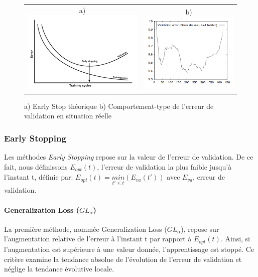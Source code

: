 \begin{figure}
    \begin{tabular}{cc}
       a) \includegraphics[scale=0.9]{./tex/regularisation/valid_ideal.png} &
         b) \includegraphics[scale=0.4]{./tex/regularisation/val_reel.png}\\
    \end{tabular}
    \caption{a) Early Stop théorique b) Comportement-type de l'erreur de validation en situation réelle}
    \label{early_courbe}
\end{figure}

\subsubsection{Early Stopping}
Les méthodes \textit{Early Stopping} repose sur la valeur de l'erreur de validation. De ce fait, nous définissons $E_{opt}(t)$, l'erreur de validation la plus faible jusqu'à l'instant t, définie par: $E_{opt}(t)=\underset{t' \leq t}{min}(E_{va}(t'))$ avec $E_{va}$, erreur de validation.

\paragraph{Generalization Loss ($GL_\alpha$)}
La première méthode, nommée Generalization Loss ($GL_\alpha$)\cite{earlystop}, repose sur l'augmentation relative de l'erreur à l'instant t par rapport à $E_{opt}(t)$. Ainsi, si l'augmentation est supérieure à une valeur donnée, l'apprentissage est stoppé. Ce critère examine la tendance absolue de l'évolution de l'erreur de validation et néglige la tendance évolutive locale.\\

